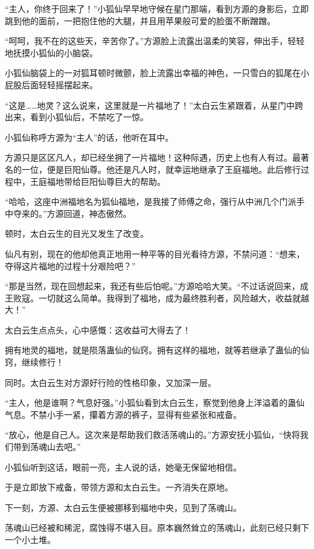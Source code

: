 
\begin{this_body}

“主人，你终于回来了！”小狐仙早早地守候在星门那端，看到方源的身影后，立即跳到他的面前，一把抱住他的大腿，并且用苹果般可爱的脸蛋不断蹭蹭。

“呵呵，我不在的这些天，辛苦你了。”方源脸上流露出温柔的笑容，伸出手，轻轻地抚摸小狐仙的小脑袋。

小狐仙脑袋上的一对狐耳顿时微颤，脸上流露出幸福的神色，一只雪白的狐尾在小屁股后面轻轻摇摆起来。

“这是……地灵？这么说来，这里就是一片福地了！”太白云生紧跟着，从星门中跨出来，看到小狐仙后，不禁吃了一惊。

小狐仙称呼方源为“主人”的话，他听在耳中。

方源只是区区凡人，却已经坐拥了一片福地！这种际遇，历史上也有人有过。最著名的一位，便是巨阳仙尊。他还是凡人时，就幸运地继承了王庭福地。此后修行过程中，王庭福地带给巨阳仙尊巨大的帮助。

“哈哈，这座中洲福地名为狐仙福地，是我接了师傅之命，强行从中洲几个门派手中夺来的。”方源回道，神态傲然。

顿时，太白云生的目光又发生了改变。

仙凡有别，现在的他却他真正地用一种平等的目光看待方源，不禁问道：“想来，夺得这片福地的过程十分艰险吧？”

“那是当然，现在回想起来，我还有些后怕呢。”方源哈哈大笑。“不过话说回来，成王败寇。一切就这么简单。我得到了福地，成为最终胜利者，风险越大，收益就越大！”

太白云生点点头，心中感慨：这收益可大得去了！

拥有地灵的福地，就是陨落蛊仙的仙窍。拥有这样的福地，就等若继承了蛊仙的仙窍，继续修行！

同时。太白云生对方源好行险的性格印象，又加深一层。

“主人，他是谁啊？气息好强。”小狐仙看到太白云生，察觉到他身上洋溢着的蛊仙气息。不禁小手一紧，攥着方源的裤子，显得有些紧张和戒备。

“放心，他是自己人。这次来是帮助我们救活荡魂山的。”方源安抚小狐仙，“快将我们带到荡魂山去吧。”

小狐仙听到这话，眼前一亮，主人说的话，她毫无保留地相信。

于是立即放下戒备，带领方源和太白云生。一齐消失在原地。

下一刻，方源、太白云生便被挪移到福地中央，见到了荡魂山。

荡魂山已经被和稀泥，腐蚀得不堪入目。原本巍然耸立的荡魂山，此刻已经只剩下一个小土堆。


\end{this_body}
